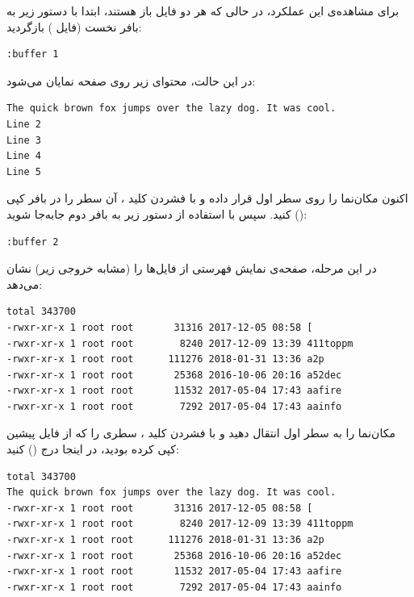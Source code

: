 برای مشاهده‌ی این عملکرد، در حالی که هر دو فایل باز هستند، ابتدا با دستور زیر به بافر نخست (فایل ) بازگردید:

\begin{latin}
\begin{lstlisting}
:buffer 1
\end{lstlisting}
\end{latin}

در این حالت، محتوای زیر روی صفحه نمایان می‌شود:

\begin{latin}
\begin{lstlisting}
The quick brown fox jumps over the lazy dog. It was cool.
Line 2
Line 3
Line 4
Line 5
\end{lstlisting}
\end{latin}

اکنون مکان‌نما را روی سطر اول قرار داده و با فشردن کلید ، آن سطر را در بافر کپی () کنید. سپس با استفاده از دستور زیر به بافر دوم جابه‌جا شوید:

\begin{latin}
\begin{lstlisting}
:buffer 2
\end{lstlisting}
\end{latin}

در این مرحله، صفحه‌ی نمایش فهرستی از فایل‌ها را (مشابه خروجی زیر) نشان می‌دهد:

\begin{latin}
\begin{lstlisting}
total 343700
-rwxr-xr-x 1 root root       31316 2017-12-05 08:58 [
-rwxr-xr-x 1 root root        8240 2017-12-09 13:39 411toppm
-rwxr-xr-x 1 root root      111276 2018-01-31 13:36 a2p
-rwxr-xr-x 1 root root       25368 2016-10-06 20:16 a52dec
-rwxr-xr-x 1 root root       11532 2017-05-04 17:43 aafire
-rwxr-xr-x 1 root root        7292 2017-05-04 17:43 aainfo
\end{lstlisting}
\end{latin}

مکان‌نما را به سطر اول انتقال دهید و با فشردن کلید ، سطری را که از فایل پیشین کپی کرده بودید، در اینجا درج () کنید:

\begin{latin}
\begin{lstlisting}
total 343700
The quick brown fox jumps over the lazy dog. It was cool.
-rwxr-xr-x 1 root root       31316 2017-12-05 08:58 [
-rwxr-xr-x 1 root root        8240 2017-12-09 13:39 411toppm
-rwxr-xr-x 1 root root      111276 2018-01-31 13:36 a2p
-rwxr-xr-x 1 root root       25368 2016-10-06 20:16 a52dec
-rwxr-xr-x 1 root root       11532 2017-05-04 17:43 aafire
-rwxr-xr-x 1 root root        7292 2017-05-04 17:43 aainfo
\end{lstlisting}
\end{latin}

